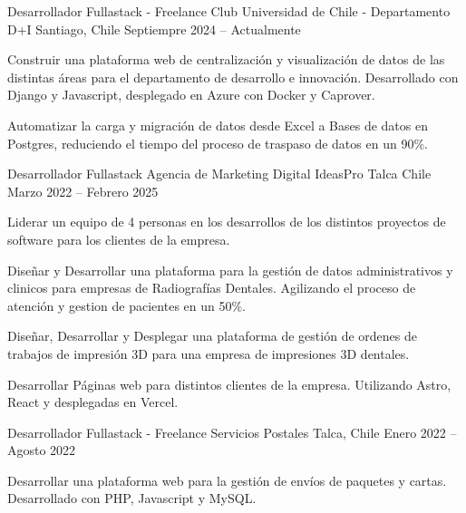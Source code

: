 \documentclass[]{awesome-cv}
\begin{document}
\begin{cventries}
	\cventry
	{Desarrollador Fullastack - Freelance}
	{Club Universidad de Chile - Departamento D+I}
	{Santiago, Chile}
	{Septiempre 2024 – Actualmente}
	{\begin{cvitems}
		\vspace{0.5mm}
		\item {Construir una plataforma web de centralización y visualización de datos de las distintas áreas para el departamento de desarrollo e innovación. Desarrollado con Django y Javascript, desplegado en Azure con Docker y Caprover.}
		\item {Automatizar la carga y migración de datos desde Excel a Bases de datos en Postgres, reduciendo el tiempo del proceso de traspaso de datos en un 90\%.}
		\end{cvitems}}

	\cventry
	{Desarrollador Fullastack}
	{Agencia de Marketing Digital IdeasPro}
	{Talca Chile}
	{Marzo 2022 – Febrero 2025}
	{\begin{cvitems}
		\vspace{0.5mm}
		\item {Liderar un equipo de 4 personas en los desarrollos de los distintos proyectos de software para los clientes de la empresa.}
		\item {Diseñar y Desarrollar una plataforma para la gestión de datos administrativos y clinicos para empresas de Radiografías Dentales. Agilizando el proceso de atención y gestion de pacientes en un 50\%.}
		\item {Diseñar, Desarrollar y Desplegar una plataforma de gestión de ordenes de trabajos de impresión 3D para una empresa de impresiones 3D dentales.}
		\item {Desarrollar Páginas web para distintos clientes de la empresa. Utilizando Astro, React y desplegadas en Vercel.}
		\end{cvitems}}

	\cventry
	{Desarrollador Fullastack - Freelance}
	{Servicios Postales}
	{Talca, Chile}
	{Enero 2022 – Agosto 2022}
	{\begin{cvitems}
		\vspace{0.5mm}
		\item {Desarrollar una plataforma web para la gestión de envíos de paquetes y cartas. Desarrollado con PHP, Javascript y MySQL.}
		\end{cvitems}}
\end{cventries}
\end{document}
